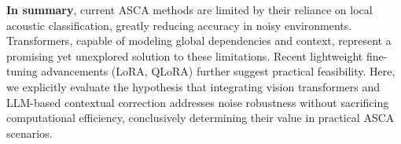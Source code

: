 \textbf{In summary}, current ASCA methods are limited by their reliance on local acoustic classification, greatly reducing accuracy in noisy environments. Transformers, capable of modeling global dependencies and context, represent a promising yet unexplored solution to these limitations. Recent lightweight fine-tuning advancements (LoRA, QLoRA) further suggest practical feasibility. Here, we explicitly evaluate the hypothesis that integrating vision transformers and LLM-based contextual correction addresses noise robustness without sacrificing computational efficiency, conclusively determining their value in practical ASCA scenarios.


